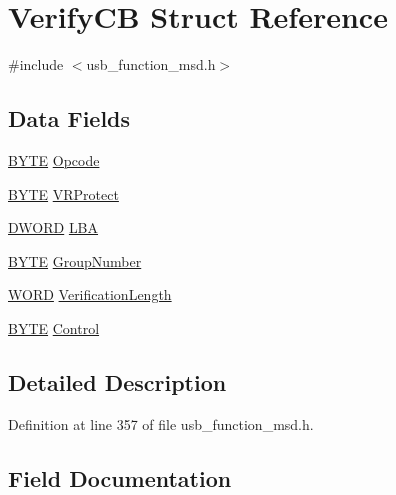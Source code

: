 \hypertarget{struct_verify_c_b}{}\section{Verify\+C\+B Struct Reference}
\label{struct_verify_c_b}


{\ttfamily \#include $<$usb\+\_\+function\+\_\+msd.\+h$>$}

\subsection*{Data Fields}
\begin{DoxyCompactItemize}
\item 
\hyperlink{_generic_type_defs_8h_a4ae1dab0fb4b072a66584546209e7d58}{B\+Y\+T\+E} \hyperlink{struct_verify_c_b_a3ac7536b907732d60214ae553910eed9}{Opcode}
\item 
\hyperlink{_generic_type_defs_8h_a4ae1dab0fb4b072a66584546209e7d58}{B\+Y\+T\+E} \hyperlink{struct_verify_c_b_abe3a1702e9d7f94e1dd1ff2272537e33}{V\+R\+Protect}
\item 
\hyperlink{_generic_type_defs_8h_ad342ac907eb044443153a22f964bf0af}{D\+W\+O\+R\+D} \hyperlink{struct_verify_c_b_a025861a8c903e77ef60526f18da19bb1}{L\+B\+A}
\item 
\hyperlink{_generic_type_defs_8h_a4ae1dab0fb4b072a66584546209e7d58}{B\+Y\+T\+E} \hyperlink{struct_verify_c_b_a6016c3942d93a2a734fa1fa61f69747b}{Group\+Number}
\item 
\hyperlink{_generic_type_defs_8h_a2b0e863dadf920709ec53d9088ee7c91}{W\+O\+R\+D} \hyperlink{struct_verify_c_b_ae4f238bf1c685f44d90bc7d825bbfe59}{Verification\+Length}
\item 
\hyperlink{_generic_type_defs_8h_a4ae1dab0fb4b072a66584546209e7d58}{B\+Y\+T\+E} \hyperlink{struct_verify_c_b_a5dc24656c27deb12af74c98930f0bfc5}{Control}
\end{DoxyCompactItemize}


\subsection{Detailed Description}


Definition at line 357 of file usb\+\_\+function\+\_\+msd.\+h.



\subsection{Field Documentation}
\hypertarget{struct_verify_c_b_a5dc24656c27deb12af74c98930f0bfc5}{}
